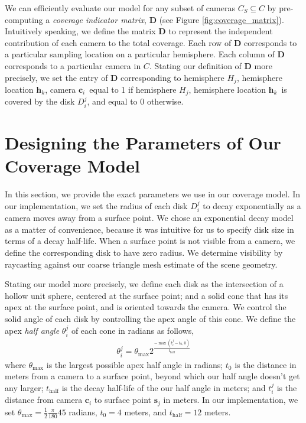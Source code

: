 We can efficiently evaluate our model for any subset of cameras $C_S \subseteq C$ by pre-computing a \emph{coverage indicator matrix}, $\mathbf{D}$ (see Figure \ref{fig:coverage_matrix}).
Intuitively speaking, we define the matrix $\mathbf{D}$ to represent the independent contribution of each camera to the total coverage.
Each row of $\mathbf{D}$ corresponds to a particular sampling location on a particular hemisphere.
Each column of $\mathbf{D}$ corresponds to a particular camera in $C$.
Stating our definition of $\mathbf{D}$ more precisely, we set the entry of $\mathbf{D}$ corresponding to \textbraceleft hemisphere $H_j$, hemisphere location $\mathbf{h}_k$, camera $\mathbf{c}_i$\textbraceright ~equal to 1 if \textbraceleft hemisphere $H_j$, hemisphere location $\mathbf{h}_k$\textbraceright ~is covered by the disk $D^j_i$, and equal to 0 otherwise.


\vspace{-5pt}
\section{Designing the Parameters of Our Coverage Model}
\label{sec:evaluating_coverage}

In this section, we provide the exact parameters we use in our coverage model.
In our implementation, we set the radius of each disk $D^j_i$ to decay exponentially as a camera moves away from a surface point.
We chose an exponential decay model as a matter of convenience, because it was intuitive for us to specify disk size in terms of a decay half-life.
When a surface point is not visible from a camera, we define the corresponding disk to have zero radius.
We determine visibility by raycasting against our coarse triangle mesh estimate of the scene geometry.

Stating our model more precisely, we define each disk as the intersection of a hollow unit sphere, centered at the surface point; and a solid cone that has its apex at the surface point, and is oriented towards the camera.
We control the solid angle of each disk by controlling the apex angle of this cone.
We define the apex \emph{half angle} $\theta^j_i$ of each cone in radians as follows,
%
\begin{equation}
\begin{aligned}
\theta^j_i = \theta_\text{max} 2^{ \frac{ -\max(t^j_i - t_0, 0) }{ t_{\text{half}} } }
\end{aligned}
\end{equation}
%
where
$\theta_{\text{max}}$ is the largest possible apex half angle in radians;
$t_0$ is the distance in meters from a camera to a surface point, beyond which our half angle doesn't get any larger;
$t_{\text{half}}$ is the decay half-life of the our half angle in meters; and
$t^j_i$ is the distance from camera $\mathbf{c}_i$ to surface point $\mathbf{s}_j$ in meters.
In our implementation, we set $\theta_{\text{max}} = \frac{1}{2} \frac{\pi}{180} 45$ radians, $t_0 = 4$ meters, and $t_\text{half} = 12$ meters.

